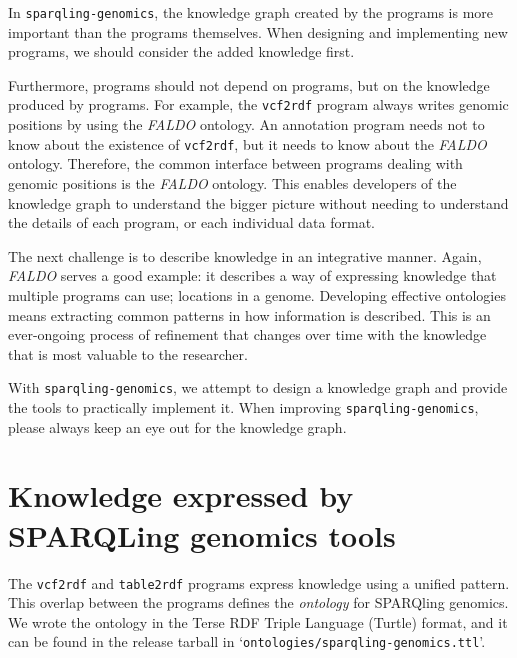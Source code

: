   In \texttt{sparqling-genomics}, the knowledge graph created by the programs
  is more important than the programs themselves.  When designing and
  implementing new programs, we should consider the added knowledge first.

  Furthermore, programs should not depend on programs, but on the knowledge
  produced by programs.  For example, the \texttt{vcf2rdf} program always
  writes genomic positions by using the \emph{FALDO} ontology.  An annotation
  program needs not to know about the existence of \texttt{vcf2rdf}, but it
  needs to know about the \emph{FALDO} ontology.  Therefore, the common
  interface between programs dealing with genomic positions is the \emph{FALDO}
  ontology.  This enables developers of the knowledge graph to understand
  the bigger picture without needing to understand the details of each
  program, or each individual data format.

  The next challenge is to describe knowledge in an integrative manner.  Again,
  \emph{FALDO} serves a good example: it describes a way of expressing knowledge
  that multiple programs can use; locations in a genome.  Developing effective
  ontologies means extracting common patterns in how information is described.
  This is an ever-ongoing process of refinement that changes over time with the
  knowledge that is most valuable to the researcher.

  With \texttt{sparqling-genomics}, we attempt to design a knowledge graph and
  provide the tools to practically implement it.  When improving
  \texttt{sparqling-genomics}, please always keep an eye out for the knowledge
  graph.

\section{Knowledge expressed by SPARQLing genomics tools}

  \begin{sloppypar}
  The \texttt{vcf2rdf} and \texttt{table2rdf} programs express knowledge using
  a unified pattern.  This overlap between the programs defines the
  \emph{ontology} for SPARQling genomics.  We wrote the ontology in the
  Terse RDF Triple Language (Turtle) format, and it can be found in the release
  tarball in \mbox{`\texttt{ontologies/sparqling-genomics.ttl}'}.
  \end{sloppypar}
